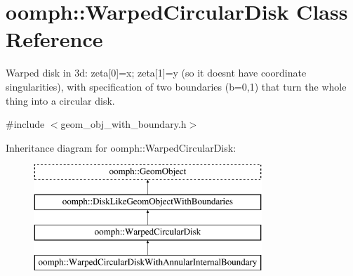 \hypertarget{classoomph_1_1WarpedCircularDisk}{}\section{oomph\+:\+:Warped\+Circular\+Disk Class Reference}
\label{classoomph_1_1WarpedCircularDisk}


Warped disk in 3d\+: zeta\mbox{[}0\mbox{]}=x; zeta\mbox{[}1\mbox{]}=y (so it doesn\textquotesingle{}t have coordinate singularities), with specification of two boundaries (b=0,1) that turn the whole thing into a circular disk.  




{\ttfamily \#include $<$geom\+\_\+obj\+\_\+with\+\_\+boundary.\+h$>$}

Inheritance diagram for oomph\+:\+:Warped\+Circular\+Disk\+:\begin{figure}[H]
\begin{center}
\leavevmode
\includegraphics[height=4.000000cm]{classoomph_1_1WarpedCircularDisk}
\end{center}
\end{figure}
